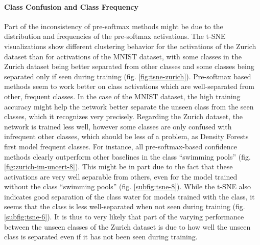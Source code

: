 \documentclass[10pt]{article}
\begin{document}
\paragraph{Class Confusion and Class Frequency}Part of the inconsistency of pre-softmax methods might be due to the distribution and frequencies of the pre-softmax activations. The \gls{t-SNE} visualizations show different clustering behavior for the activations of the Zurich dataset than for activations of the \gls{MNIST} dataset, with some classes in the Zurich dataset being better separated from other classes and some classes being separated only if seen during training (fig. \ref{fig:tsne-zurich}). Pre-softmax based methods seem to work better on class activations which are well-separated from other, frequent classes. In the case of the \gls{MNIST} dataset, the high training accuracy might help the network better separate the unseen class from the seen classes, which it recognizes very precisely. Regarding the Zurich dataset, the network is trained less well, however some classes are only confused with infrequent other classes, which should be less of a problem, as Density Forests first model frequent classes. For instance, all pre-softmax-based confidence methods clearly outperform other baselines in the class ``swimming pools'' (fig. \ref{fig:zurich-im-uncert-8}). This might be in part due to the fact that these activations are very well separable from others, even for the model trained without the class ``swimming pools'' (fig. \ref{subfig:tsne-8}). While the \gls{t-SNE} also indicates good separation of the class water for models trained with the class, it seems that the class is less well-separated when not seen during training (fig. \ref{subfig:tsne-6}). It is thus to very likely that part of the varying performance between the unseen classes of the Zurich dataset is due to how well the unseen class is separated even if it has not been seen during training.

\end{document}
